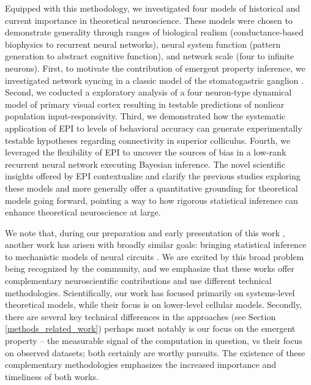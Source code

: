 \documentclass[11pt]{article}
\begin{document}
Equipped with this methodology, we investigated four models of historical and current importance in theoretical neuroscience.
These models were chosen to demonstrate generality through ranges of biological realism (conductance-based biophysics to recurrent neural networks), neural system function (pattern generation to abstract cognitive function), and network scale (four to infinite neurons).
First, to motivate the contribution of emergent property inference, we investigated network syncing in a classic model of the stomatogastric ganglion \cite{gutierrez2013multiple}.   
Second, we coducted a exploratory analysis of a four neuron-type dynamical model of primary visual cortex resulting in testable predictions of nonliear population input-responsivity. 
Third, we demonstrated how the systematic application of EPI to levels of behavioral accuracy can generate experimentally testable hypotheses regarding connectivity in superior colliculus.  
Fourth, we leveraged the flexibility of EPI to uncover the sources of bias in a low-rank recurrent neural network executing Bayesian inference.  
The novel scientific insights offered by EPI contextualize and clarify the previous studies exploring these models \cite{gutierrez2013multiple, litwin2016inhibitory, duan2018collicular, mastrogiuseppe2018linking} and more generally offer a quantitative grounding for theoretical models  going forward, pointing a way to how rigorous statistical inference can enhance theoretical neuroscience at large.



We note that, during our preparation and early presentation of this work \cite{bittner2019degenerate, bittner2019examining}, another work has arisen with broadly similar goals: bringing statistical inference to mechanistic models of neural circuits \cite{lueckmann2019amortised}.  We are excited by this broad problem being recognized by the community, and we emphasize that these works offer complementary neuroscientific contributions and use different technical methodologies.  Scientifically, our work has focused primarily on systems-level theoretical models, while their focus is on lower-level cellular models.
Secondly, there are several key technical differences in the approaches (see Section \ref{methods_related_work}) perhaps most notably is our focus on the emergent property -- the measurable signal of the computation in question, vs their focus on observed datasets; both certainly are worthy pursuits.
The existence of these complementary methodologies emphasizes the increased importance and timeliness of both works. 
\end{document}
